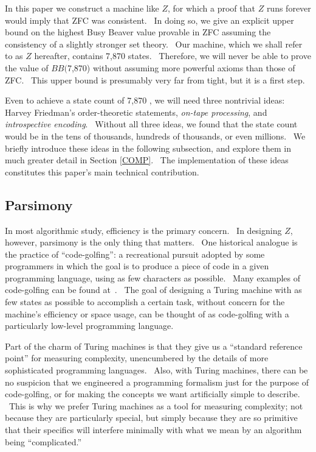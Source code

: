 \documentclass[11pt]{article}
\newcommand{\statenum}{7,870 }
\newcommand{\bbstatenum}{$BB($7,870) }
\begin{document}
In this paper we construct a machine like $Z$, for which a proof that $Z$ runs forever would imply that ZFC was consistent. \ In doing so, we give an explicit upper bound on the highest Busy Beaver value provable in ZFC assuming the consistency of a slightly stronger set theory. \ Our machine, which we shall refer to as $Z$ hereafter, contains \statenum states. \ Therefore, we will never be able to prove the value of \bbstatenum without assuming more powerful axioms than those of ZFC. \ This upper bound is presumably very far from tight, but it is a first step.

Even to achieve a state count of \statenum, we will need three nontrivial ideas: Harvey Friedman's order-theoretic statements, \emph{on-tape processing}, and \emph{introspective encoding}. \ Without all three ideas, we found that the state count would be in the tens of thousands, hundreds of thousands, or even millions. \ We briefly introduce these ideas in the following subsection, and explore them in much greater detail in Section \ref{COMP}. \ The implementation of these ideas constitutes this paper's main technical contribution.

\subsection{Parsimony}

In most algorithmic study, efficiency is the primary concern. \ In designing $Z$, however, parsimony is the only thing that matters. \ One historical analogue is the practice of ``code-golfing'': a recreational pursuit adopted by some programmers in which the goal is to produce a piece of code in a given programming language, using as few characters as possible. \ Many examples of code-golfing can be found at~\cite{codegolf}. \ The goal of designing a Turing machine with as few states as possible to accomplish a certain task, without concern for the machine's efficiency or space usage, can be thought of as code-golfing with a particularly low-level programming language.

Part of the charm of Turing machines is that they give us a ``standard reference point'' for measuring complexity, unencumbered by the details of more sophisticated programming languages. \ Also, with Turing machines, there can be no suspicion that we engineered a programming formalism just for the purpose of code-golfing, or for making the concepts we want artificially simple to describe. \ This is why we prefer Turing machines as a tool for measuring complexity; not because they are particularly special, but simply because they are so primitive that their specifics will interfere minimally with what we mean by an algorithm being ``complicated.''
\end{document}

